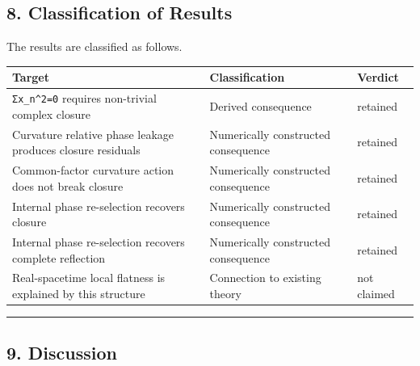 \documentclass[
  a4paper,
]{article}
\newcounter{none} %
\begin{document}
\subsection{8. Classification of
Results}\label{classification-of-results}

The results are classified as follows.

{\def\LTcaptype{none} %
\begin{longtable}[]{@{}
  >{\raggedright\arraybackslash}p{}
  >{\raggedright\arraybackslash}p{}
  >{\raggedright\arraybackslash}p{}@{}}
\toprule\noalign{}
\begin{minipage}[b]{\linewidth}\raggedright
Target
\end{minipage} & \begin{minipage}[b]{\linewidth}\raggedright
Classification
\end{minipage} & \begin{minipage}[b]{\linewidth}\raggedright
Verdict
\end{minipage} \\
\midrule\noalign{}
\endhead
\bottomrule\noalign{}
\endlastfoot
\texttt{Σx\_n\^{}2=0} requires non-trivial complex closure & Derived
consequence & retained \\
Curvature relative phase leakage produces closure residuals &
Numerically constructed consequence & retained \\
Common-factor curvature action does not break closure & Numerically
constructed consequence & retained \\
Internal phase re-selection recovers closure & Numerically constructed
consequence & retained \\
Internal phase re-selection recovers complete reflection & Numerically
constructed consequence & retained \\
Real-spacetime local flatness is explained by this structure &
Connection to existing theory & not claimed \\
\end{longtable}
}

\begin{center}\rule{0.5\linewidth}{0.5pt}\end{center}

\subsection{9. Discussion}\label{discussion}
\end{document}
